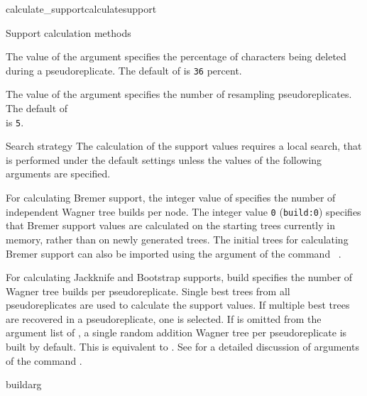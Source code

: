 \begin{command}{calculate\_support}{calculatesupport}
\begin{arguments}
\begin{argumentgroup}{Support calculation methods}
                          
            \begin{description}
                    {The value of the argument  specifies the
                    percentage of characters being deleted during a pseudoreplicate. The
                    default of  is \texttt{36} percent.}
                    {}

                    {The value of the argument  specifies the
                    number of resampling pseudoreplicates. The default of \\
                     is \texttt{5}.}
                    {}
            \end{description}
        \end{argumentgroup}

        \begin{argumentgroup}{Search strategy}
            {The calculation of the support values requires a local search,
            that is performed under the default settings unless the values
            of the following arguments are specified.}
         
                {For calculating Bremer support, the integer value of
                 specifies the number of independent Wagner
                tree builds per node. The integer value \texttt{0} (\texttt{build:0})
                specifies that Bremer support values are calculated on the starting
                trees currently in memory, rather than on newly generated trees.
                The initial trees for calculating Bremer support can also be
                imported using the argument  of the command
                ~.
             
                For calculating Jackknife and Bootstrap supports, build specifies
                the number of Wagner tree builds per pseudoreplicate. Single best
                trees from all pseudoreplicates are used to calculate the support
                values. If multiple best trees are recovered in a pseudoreplicate,
                one is selected. If  is omitted from the argument
                list of , a single random addition
                Wagner tree per pseudoreplicate is built by default. This is
                equivalent to . See
                 for a detailed discussion of arguments
                of the command .}
                {buildarg}


\end{argumentgroup}
\end{arguments}
\end{command}
